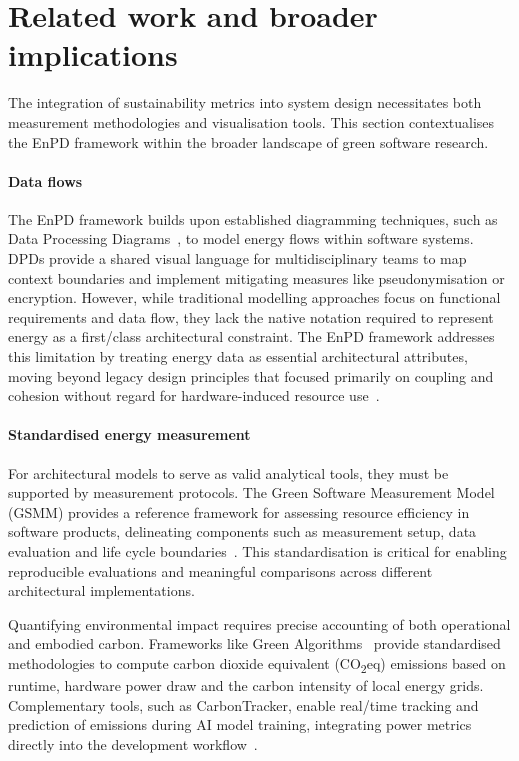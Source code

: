 \documentclass[11pt,a4paper]{article}
\begin{document}
\section{Related work and broader implications}
The integration of sustainability metrics into system design necessitates both measurement methodologies and visualisation tools.
This section contextualises the EnPD framework within the broader landscape of green software research.

\paragraph{Data flows}
The EnPD framework builds upon established diagramming techniques, such as Data Processing Diagrams~\cite{bieker2025data}, to model energy flows within software systems.
DPDs provide a shared visual language for multidisciplinary teams to map context boundaries and implement mitigating measures like pseudonymisation or encryption.
However, while traditional modelling approaches focus on functional requirements and data flow, they lack the native notation required to represent energy as a first\-/class architectural constraint.
The EnPD framework addresses this limitation by treating energy data as essential architectural attributes, moving beyond legacy design principles that focused primarily on coupling and cohesion without regard for hardware-induced resource use~\cite{yourdon1979structured}.

\paragraph{Standardised energy measurement}
For architectural models to serve as valid analytical tools, they must be supported by measurement protocols.
The Green Software Measurement Model (GSMM) provides a reference framework for assessing resource efficiency in software products, delineating components such as measurement setup, data evaluation and life cycle boundaries~\cite{guldner2024development}.
This standardisation is critical for enabling reproducible evaluations and meaningful comparisons across different architectural implementations.

Quantifying environmental impact requires precise accounting of both operational and embodied carbon.
Frameworks like Green Algorithms~\cite{lannelongue2021green} provide standardised methodologies to compute carbon dioxide equivalent (CO\textsubscript{2}eq) emissions based on runtime, hardware power draw and the carbon intensity of local energy grids.
Complementary tools, such as CarbonTracker, enable real\-/time tracking and prediction of emissions during AI model training, integrating power metrics directly into the development workflow~\cite{anthony2020carbontracker}.
\end{document}
